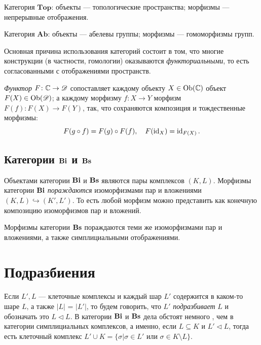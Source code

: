 \documentclass[10pt, twoside]{article}
\begin{document}
\begin{example}
Категория $\mathbf{Top}$: объекты --- топологические пространства; морфизмы --- непрерывные отображения.
\end{example}

\begin{example}
Категория $\mathbf{Ab}$: объекты --- абелевы группы; морфизмы --- гомоморфизмы групп.
\end{example}

Основная причина использования категорий состоит в том, что многие конструкции (в частности, гомологии) оказываются \emph{функториальными}, то есть согласованными с отображениями пространств.

\begin{definition}
\emph{Функтор} $F \colon \mathbb C \to \mathscr D$ сопоставляет каждому объекту $X \in \operatorname{Ob}(\mathbb C)$ объект $F(X) \in \operatorname{Ob}(\mathscr D)$; а каждому морфизму $f : X \to Y$ морфизм $F(f) : F(X) \to F(Y)$, так, что сохраняются композиция и тождественные морфизмы:
\[
F(g \circ f) = F(g)\circ F(f), \quad F(\operatorname{id}_X) = \operatorname{id}_{F(X)}.
\]
\end{definition}

\subsection[Категории Bi и Bs]{Категории $\mathbf{Bi}$ и $\mathbf{Bs}$}
Объектами категории $\mathbf{Bi}$ и $\mathbf{Bs}$ являются пары комплексов $(K, L)$. Морфизмы категории $\mathbf{Bi}$ \emph{пораждаются} изоморфизмами пар и вложениями $(K, L) \hookrightarrow (K', L')$. То есть любой морфизм можно представить как конечную композицию изоморфизмов пар и вложений.

Морфизмы категории $\mathbf{Bs}$ пораждаются теми же изоморфизмами пар и вложениями, а также симплициальными отображениями. 

\section{Подразбиения}
Если $L', L$ --- клеточные комплексы и каждый шар $L'$ содержится в каком-то шаре $L$, а также $|L|$ = $|L'|$, то будем говорить, что $L'$ \emph{подразбивает} $L$ и обозначать это $L \triangleleft L$. В категории $\mathbf{Bi}$ и $\mathbf{Bs}$ дела обстоят немного , чем в категории симплициальных комплексов, а именно, если $L \subseteq K$ и $L' \triangleleft L$, тогда есть клеточный комплекс $L' \cup K = \{\sigma| \sigma \in L' \text{ или } \sigma \in K\setminus L\}$.
\end{document}
